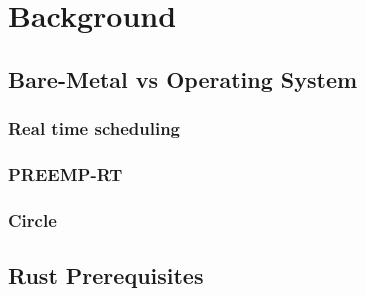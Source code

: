 \chapter{Background}
\label{chap:background}

\begin{comment}
Kurse aus meiner Vertiefung:
    - Prozessorarchitektur
    - Funktionales Programmieren
    - Grundlagen eingebetteter Systeme
    - OS-based programming of embedded systems

- Real Time Linux (PREEMPT-RT specifically)
- Bcm2711 hardware capabilities
- Rust general features over C (Traits, algebraic enums etc)
- Rust embedded ecosystem
- Spi
- 
\end{comment}

\section{Bare-Metal vs Operating System}
\label{sec:background:bm_vs_os}


\subsection{Real time scheduling}
\label{sec:background:bm_vs_os:rtos}

\subsection{PREEMP-RT}
\label{sec:background:bm_vs_os:preempt_rt}

\subsection{Circle}
\label{sec:background:bm_vs_os:circle}

\section{Rust Prerequisites}
\label{sec:background:rust}

